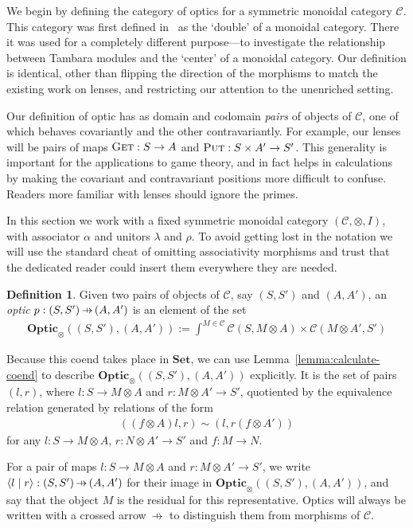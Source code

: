 \documentclass[11pt,letterpaper]{article}
\theoremstyle{plain}
\theoremstyle{definition}
\newtheorem{definition}[theorem]{Definition}
\newcommand{\C}{\mathscr{C}}
\newcommand{\Set}{\mathbf{Set}}
\newcommand{\Optic}{\mathbf{Optic}}
\newcommand{\rep}[2]{{\ensuremath \left\langle #1 \mid #2 \right\rangle}}
\newcommand{\fget}{\textsc{Get}}
\newcommand{\fput}{\textsc{Put}}
\newcommand{\hto}{\ensuremath{\,\mathaccent\shortmid\rightarrow\,}}
\begin{document}
We begin by defining the category of optics for a symmetric monoidal category $\C$. This category was first defined in~\cite[Section 6]{Doubles} as the `double' of a monoidal category. There it was used for a completely different purpose---to investigate the relationship between Tambara modules and the `center' of a monoidal category. Our definition is identical, other than flipping the direction of the morphisms to match the existing work on lenses, and restricting our attention to the unenriched setting.

Our definition of optic has as domain and codomain \emph{pairs} of objects of $\C$, one of which behaves covariantly and the other contravariantly. For example, our lenses will be pairs of maps $\fget : S \to A$ and $\fput : S \times A' \to S'$. This generality is important for the applications to game theory, and in fact helps in calculations by making the covariant and contravariant positions more difficult to confuse. Readers more familiar with lenses should ignore the primes.

  In this section we work with a fixed symmetric monoidal category $(\C, \otimes, I)$, with associator $\alpha$ and unitors $\lambda$ and $\rho$. To avoid getting lost in the notation we will use the standard cheat of omitting associativity morphisms and trust that the dedicated reader could insert them everywhere they are needed.

\begin{definition}
  Given two pairs of objects of $\C$, say $(S, S')$ and $(A, A')$, an \emph{optic} $p : (S, S') \hto (A, A')$ is an element of the set
  \begin{align*}
    \Optic_\otimes((S, S'), (A, A')) := \int^{M \in \C} \C(S, M \otimes A) \times \C(M \otimes A', S')
  \end{align*}
\end{definition}

Because this coend takes place in $\Set$, we can use Lemma~\ref{lemma:calculate-coend} to describe $\Optic_\otimes((S, S'), (A, A'))$ explicitly. It is the set of pairs $(l, r)$, where $l : S \to M \otimes A$ and $r : M \otimes A' \to S'$, quotiented by the equivalence relation generated by relations of the form
\begin{align*}
  ((f \otimes A) l, r) \sim (l, r (f \otimes A'))
\end{align*}
for any $l : S \to M \otimes A$, $r : N \otimes A' \to S'$ and $f : M \to N$.

For a pair of maps $l : S \to M \otimes A$ and $r : M \otimes A' \to S'$, we write $\rep{l}{r} : (S, S') \hto (A, A')$ for their image in $\Optic_\otimes((S, S'), (A, A'))$, and say that the object $M$ is the residual for this representative. Optics will always be written with a crossed arrow $\hto$ to distinguish them from morphisms of $\C$.
\end{document}
